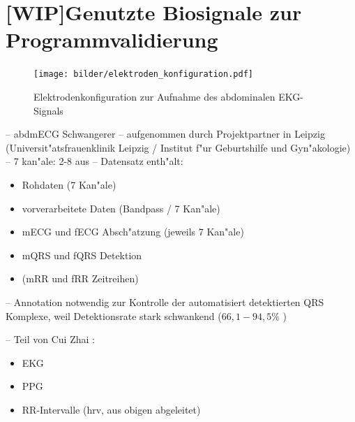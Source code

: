 
\section{[WIP]Genutzte Biosignale zur Programmvalidierung}
\label{sec:genutzte_biosignale}

\begin{figure}
	\centering
	\texttt{[image: bilder/elektroden\_konfiguration.pdf]}
	\caption[Elektrodenkonfiguration zur Aufnahme des abdominalen \ac{EKG}-Signals]{Elektrodenkonfiguration zur Aufnahme des abdominalen \ac{EKG}-Signals \cite{Zaunseder2012}}
	\label{pic:elektroden_konfig}
\end{figure}

-- abdmECG Schwangerer
-- aufgenommen durch Projektpartner in Leipzig (Universit"atsfrauenklinik Leipzig / Institut f"ur Geburtshilfe und Gyn"akologie)
-- 7 kan"ale: 2-8 aus \cite{Zaunseder2012}
-- Datensatz enth"alt: 
\begin{itemize}
	\item Rohdaten (7 Kan"ale)
	\item vorverarbeitete Daten (Bandpass / 7 Kan"ale)
	\item mECG und fECG Absch"atzung (jeweils 7 Kan"ale)
	\item mQRS und fQRS Detektion
	\item (mRR und fRR Zeitreihen)
\end{itemize}
-- Annotation notwendig zur Kontrolle der automatisiert detektierten QRS Komplexe, weil Detektionsrate stark schwankend ($66,1 - 94,5$\% \cite{Zaunseder2012})

-- Teil von Cui Zhai \cite{Zhai2012}:
\begin{itemize}
	\item \ac{EKG}
	\item \ac{PPG}
	\item RR-Intervalle (\ac{hrv}, aus obigen abgeleitet)
\end{itemize}


